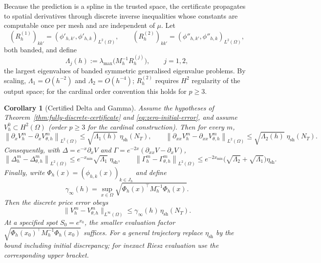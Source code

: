 \documentclass[11pt]{amsart}
\newtheorem{corollary}[theorem]{Corollary}
\theoremstyle{remark}
\newcommand{\Mh}{M_h}
\newcommand{\norm}[1]{\left\lVert #1\right\rVert}
\newcommand{\etaSharp}{\eta_{\mathrm{sh}}}
\begin{document}
Because the prediction is a spline in the trusted space, the certificate
propagates to spatial derivatives through discrete inverse inequalities whose
constants are computable once per mesh and are independent of $\mu$.  Let
\begin{equation}
  (R_h^{(1)})_{kk'}=(\phi'_{h,k'},\phi'_{h,k})_{L^2(\Omega)},
  \qquad
  (R_h^{(2)})_{kk'}=(\phi''_{h,k'},\phi''_{h,k})_{L^2(\Omega)},
  \label{eq:derivative-gram}
\end{equation}
both banded, and define
\begin{equation}
  \Lambda_j(h):=\lambda_{\max}\bigl(\Mh^{-1}R_h^{(j)}\bigr),
  \qquad j=1,2 ,
  \label{eq:inverse-constants}
\end{equation}
the largest eigenvalues of banded symmetric generalised eigenvalue problems.
By scaling, $\Lambda_1=O(h^{-2})$ and $\Lambda_2=O(h^{-4})$; $R_h^{(2)}$ requires $H^2$ regularity of the output space;
for the cardinal order convention this holds for $p\ge3$.

\begin{corollary}[Certified Delta and Gamma]
\label{cor:greeks}
Assume the hypotheses of Theorem~\ref{thm:fully-discrete-certificate} and
\eqref{eq:zero-initial-error}, and assume $V_h^0\subset H^2(\Omega)$ (order $p\ge3$ for the
cardinal construction). Then for every $m$,
\begin{equation}
  \norm{\partial_xV_h^m-\partial_xV_{\theta,h}^m}_{L^2(\Omega)}
  \le\sqrt{\Lambda_1(h)}\;\etaSharp(N_T),
  \qquad
  \norm{\partial_{xx}V_h^m-\partial_{xx}V_{\theta,h}^m}_{L^2(\Omega)}
  \le\sqrt{\Lambda_2(h)}\;\etaSharp(N_T).
  \label{eq:greek-L2}
\end{equation}
Consequently, with $\Delta=e^{-x}\partial_xV$ and
$\Gamma=e^{-2x}(\partial_{xx}V-\partial_xV)$,
\begin{equation}
  \norm{\Delta_h^m-\Delta_{\theta,h}^m}_{L^2(\Omega)}
  \le e^{-x_{\min}}\sqrt{\Lambda_1}\;\etaSharp,
  \qquad
  \norm{\Gamma_h^m-\Gamma_{\theta,h}^m}_{L^2(\Omega)}
  \le e^{-2x_{\min}}\bigl(\sqrt{\Lambda_2}+\sqrt{\Lambda_1}\bigr)\etaSharp .
  \label{eq:greek-financial}
\end{equation}
Finally, write $\Phi_h(x)=(\phi_{h,k}(x))_{k\in J_h}$ and define
\begin{equation}
 \gamma_\infty(h)=\sup_{x\in\Omega}
       \sqrt{\Phi_h(x)^\top M_h^{-1}\Phi_h(x)}.
 \label{eq:gamma-infty}
\end{equation}
Then the discrete price error obeys
\begin{equation}
 \|V_h^m-V_{\theta,h}^m\|_{L^\infty(\Omega)}
 \le\gamma_\infty(h)\,\etaSharp(N_T).
 \label{eq:greek-Linf}
\end{equation}
At a specified spot $S_0=e^{x_0}$, the smaller evaluation factor
$\sqrt{\Phi_h(x_0)^\top M_h^{-1}\Phi_h(x_0)}$ suffices. For a general
trajectory replace $\etaSharp$ by the bound including initial discrepancy;
for inexact Riesz evaluation use the corresponding upper bracket.
\end{corollary}
\end{document}
